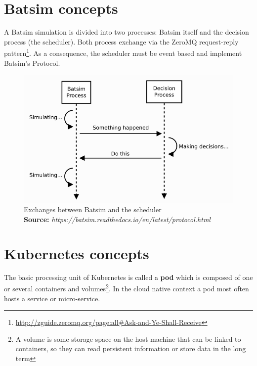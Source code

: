 \documentclass[12pt, a4paper]{memoir}
\newcommand*{\captionsource}[2]{%
    \caption[{#1}]{%
        #1%
        \\\hspace{\linewidth}%
	\textbf{Source:} \textit{#2}%
    }%
}
\begin{document}
\section{Batsim concepts}

A Batsim simulation is divided into two processes: Batsim itself and the
decision process (the scheduler). Both process exchange via the ZeroMQ
request-reply
pattern\footnote{\url{http://zguide.zeromq.org/page:all\#Ask-and-Ye-Shall-Receive}}.
As a consequence, the scheduler must be event based and implement Batsim's
Protocol.

\begin{figure}[H]
	\centering
	\includegraphics[scale=0.5]{imgs/batsim-sequence-diag.png}
	\captionsource{Exchanges between Batsim and the scheduler}{https://batsim.readthedocs.io/en/latest/protocol.html}
	\label{fig:bati-seq-diag}
\end{figure}

\section{Kubernetes concepts}

The basic processing unit of Kubernetes is called a \textbf{pod} which is
composed of one or several containers and volumes\footnote{A volume is some
	storage space on the host machine that can be linked to containers, so
	they can read persistent information or store data in the long term}.
In the cloud native context a pod most often hosts a service or micro-service.
\end{document}

